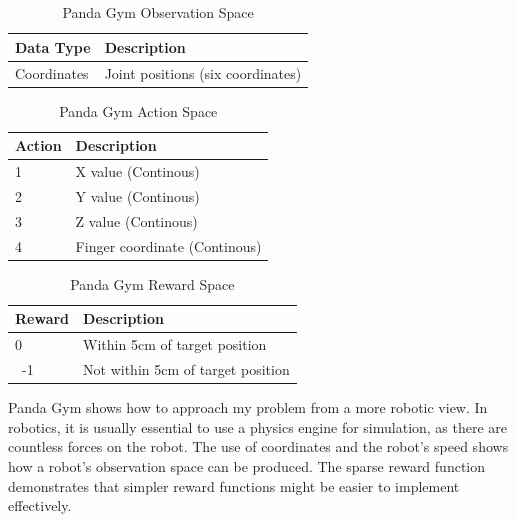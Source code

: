 \documentclass[a4paper,12pt]{article}
\begin{document}
\\\\
\begin{table}[H]
\centering
\caption{Panda Gym Observation Space}
\label{tab:Panda Gym Observation Space}
\begin{tabular}{|ll|}
\hline
\textbf{Data Type} & \textbf{Description}\\ \hline
Coordinates & Joint positions (six coordinates) \\ \hline
\end{tabular}
\end{table}

\begin{table}[H]
\centering
\caption{Panda Gym Action Space}
\label{tab:Panda Gym Action Space}
\begin{tabular}{|ll|}
\hline
\textbf{Action} & \textbf{Description}\\ \hline
1 & X value (Continous)\\ 
2 & Y value (Continous)\\ 
3 & Z value (Continous)\\ 
4 & Finger coordinate (Continous)\\ \hline
\end{tabular}
\end{table}

\begin{table}[H]
\centering
\caption{Panda Gym Reward Space}
\label{tab:Panda Gym Reward Space}
\begin{tabular}{|ll|}
\hline
\textbf{Reward} & \textbf{Description}\\ \hline
0 & Within 5cm of target position\\ \
-1 & Not within 5cm of target position \\ \hline
\end{tabular}
\end{table}
\noindent
Panda Gym shows how to approach my problem from a more robotic view. In robotics, it is usually essential to use a physics engine for simulation, as there are countless forces on the robot. The use of coordinates and the robot's speed shows how a robot's observation space can be produced. The sparse reward function demonstrates that simpler reward functions might be easier to implement effectively.
\end{document}
